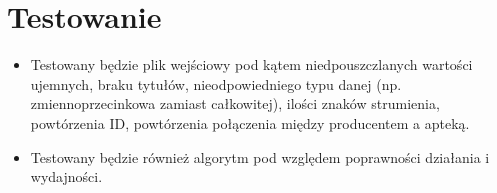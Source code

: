 \documentclass[11pt]{article}
\begin{document}
\section{Testowanie}
\begin{itemize}
    \item Testowany będzie plik wejściowy pod kątem niedpouszczlanych wartości ujemnych, braku tytułów, nieodpowiedniego typu danej (np. zmiennoprzecinkowa zamiast całkowitej), ilości znaków strumienia, powtórzenia ID, powtórzenia połączenia między producentem a apteką.
    \item Testowany będzie również algorytm pod względem poprawności działania i wydajności.
\end{itemize}
\end{document}
